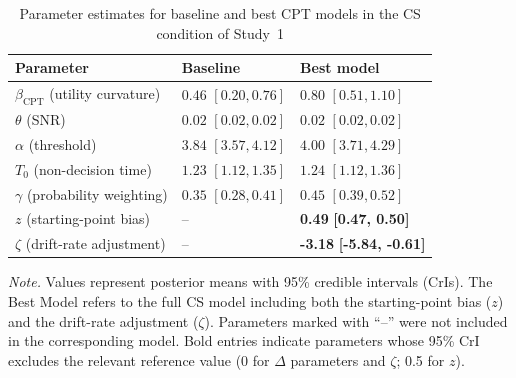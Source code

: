 \documentclass[man,floatsintext]{apa7}
\begin{document}
\begin{table}[!htbp]
\centering
\begin{threeparttable}\small
\caption{Parameter estimates for baseline and best CPT models in the CS condition of Study~1}
\label{tab:cpt_pe_cs_study1}
\begin{tabularx}{\linewidth}{@{} >{\raggedright\arraybackslash}p{6cm} >{\centering\arraybackslash}X >{\centering\arraybackslash}X @{}}
\toprule
\textbf{Parameter} & \textbf{Baseline} & \textbf{Best model} \\
\midrule
$\beta_{\text{CPT}}$ (utility curvature) & $0.46$ $[0.20, 0.76]$ & $0.80$ $[0.51, 1.10]$ \\
$\theta$ (SNR) & $0.02$ $[0.02, 0.02]$ & $0.02$ $[0.02, 0.02]$ \\
$\alpha$ (threshold) & $3.84$ $[3.57, 4.12]$ & $4.00$ $[3.71, 4.29]$ \\
$T_0$ (non-decision time) & $1.23$ $[1.12, 1.35]$ & $1.24$ $[1.12, 1.36]$ \\
$\gamma$ (probability weighting) & $0.35$ $[0.28, 0.41]$ & $0.45$ $[0.39, 0.52]$ \\
$z$ (starting-point bias) & -- & \textbf{0.49} \textbf{[0.47, 0.50]} \\
$\zeta$ (drift-rate adjustment) & -- & \textbf{-3.18} \textbf{[-5.84, -0.61]} \\
\bottomrule
\end{tabularx}
\begin{tablenotes}
\item \textit{Note.} Values represent posterior means with 95\% credible intervals (CrIs). The Best Model refers to the full CS model including both the starting-point bias ($z$) and the drift-rate adjustment ($\zeta$). Parameters marked with ``--'' were not included in the corresponding model. Bold entries indicate parameters whose 95\% CrI excludes the relevant reference value (0 for $\Delta$ parameters and $\zeta$; 0.5 for $z$).
\end{tablenotes}
\end{threeparttable}
\end{table}
\end{document}
